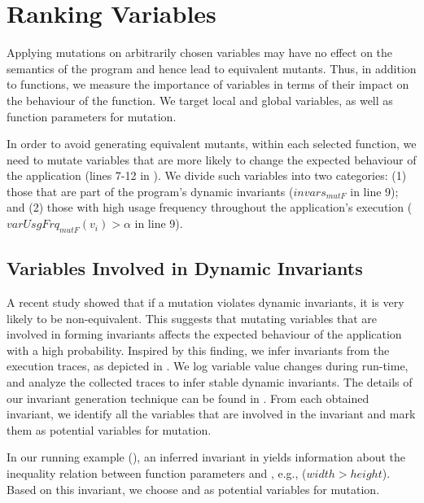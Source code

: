 \section{Ranking Variables}  \label{variable-ranking}

Applying mutations on arbitrarily chosen variables may have no effect on the semantics of the program and hence lead to equivalent mutants. Thus, in addition to functions, we  measure the importance of variables in terms of their impact on the behaviour of the function.  We target local and global variables, as well as function parameters for mutation. 

In order to avoid generating equivalent mutants, within each selected function, we need to mutate variables that are more likely to change the expected behaviour of the application (lines 7-12 in ).
We divide such variables into two categories: 
(1) those that are part of the program's dynamic invariants ($invars_{mutF}$ in line 9);
and (2) those with high usage frequency throughout the application's execution ($varUsgFrq_{mutF}(v_i)>\alpha$ in line 9).

\subsection{Variables Involved in Dynamic Invariants} 
A recent study \cite{schuler:issta09} showed that if a mutation violates dynamic invariants, it is very likely to be non-equivalent. 
This suggests that mutating variables that are involved in
forming invariants affects the expected behaviour of the application with a high probability.
Inspired by this finding, we infer invariants from the execution traces, as depicted in . We log variable value changes during run-time, and analyze the collected traces to infer stable dynamic invariants. The details of our \javascript invariant generation technique can be found in  \cite{mirshokraie:icwe12}. From each obtained invariant, we identify all the variables that are involved in the invariant and mark them as potential variables for mutation. 

In our running example (), an inferred invariant in  yields information about the inequality relation between function parameters  and , e.g.,  ($width>height$). Based on this invariant, we choose
 and  as potential variables for mutation.

